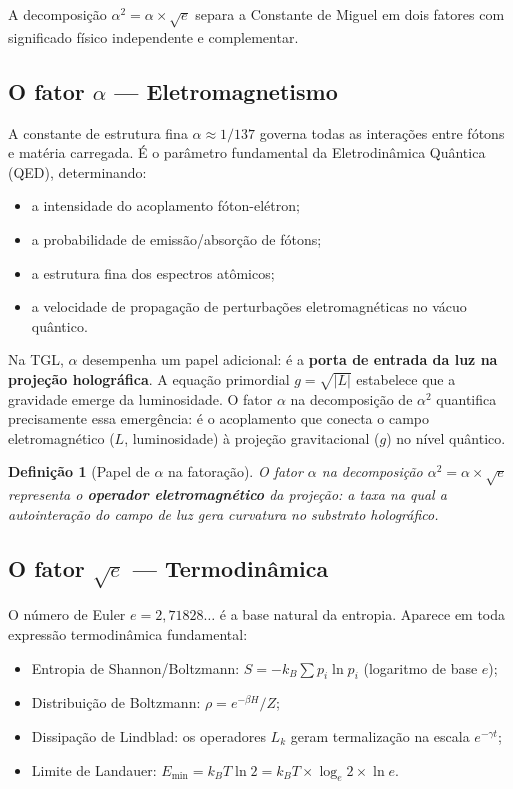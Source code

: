 \documentclass[12pt,a4paper,twoside]{article}
\newtheorem{definition}[theorem]{Definição}
\newcommand{\alphaii}{\alpha^{2}}
\begin{document}
A decomposição $\alphaii = \alpha \times \sqrt{e}$ separa a Constante de Miguel em dois fatores com significado físico independente e complementar.

\subsection{O fator $\alpha$ --- Eletromagnetismo}

A constante de estrutura fina $\alpha \approx 1/137$ governa todas as interações entre fótons e matéria carregada. É o parâmetro fundamental da Eletrodinâmica Quântica (QED), determinando:

\begin{itemize}[nosep]
\item a intensidade do acoplamento fóton-elétron;
\item a probabilidade de emissão/absorção de fótons;
\item a estrutura fina dos espectros atômicos;
\item a velocidade de propagação de perturbações eletromagnéticas no vácuo quântico.
\end{itemize}

Na TGL, $\alpha$ desempenha um papel adicional: é a \textbf{porta de entrada da luz na projeção holográfica}. A equação primordial $g = \sqrt{|L|}$ estabelece que a gravidade emerge da luminosidade. O fator $\alpha$ na decomposição de $\alphaii$ quantifica precisamente essa emergência: é o acoplamento que conecta o campo eletromagnético ($L$, luminosidade) à projeção gravitacional ($g$) no nível quântico.

\begin{definition}[Papel de $\alpha$ na fatoração]
O fator $\alpha$ na decomposição $\alphaii = \alpha \times \sqrt{e}$ representa o \textbf{operador eletromagnético} da projeção: a taxa na qual a autointeração do campo de luz gera curvatura no substrato holográfico.
\end{definition}

\subsection{O fator $\sqrt{e}$ --- Termodinâmica}

O número de Euler $e = 2{,}71828\ldots$ é a base natural da entropia. Aparece em toda expressão termodinâmica fundamental:

\begin{itemize}[nosep]
\item Entropia de Shannon/Boltzmann: $S = -k_B \sum p_i \ln p_i$ (logaritmo de base $e$);
\item Distribuição de Boltzmann: $\rho = e^{-\beta H} / Z$;
\item Dissipação de Lindblad: os operadores $L_k$ geram termalização na escala $e^{-\gamma t}$;
\item Limite de Landauer: $E_{\min} = k_B T \ln 2 = k_B T \times \log_e 2 \times \ln e$.
\end{itemize}
\end{document}
